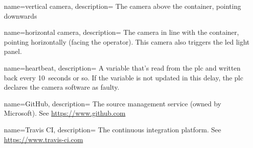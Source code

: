 %
%


{
    name={vertical camera},
    description={
        The camera above the container, pointing downwards
    }
}

{
    name={horizontal camera},
    description={
        The camera in line with the container, pointing horizontally (facing the operator).
        This camera also triggers the led light panel.
    }
}

{
    name={heartbeat},
    description={
        A variable that's read from the \gls{plc} and written back every 10~seconds or so.
        If the variable is not updated in this delay, the \gls{plc} declares the camera software as faulty.
    }
}

{
    name={GitHub},
    description={
        The source management service (owned by Microsoft).
        See \url{https://www.github.com}
    }
}

{
    name={Travis CI},
    description={
        The continuous integration platform.
        See \url{https://www.travis-ci.com}
    }
}


